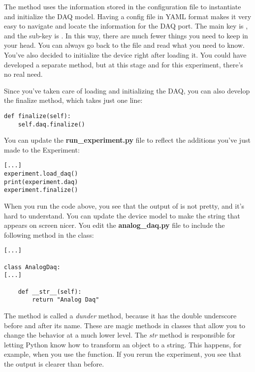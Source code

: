 The  method uses the information stored in the configuration file to instantiate and initialize the DAQ model. Having a config file in YAML format makes it very easy to navigate and locate the information for the DAQ port. The main key is , and the sub-key is . In this way, there are much fewer things you need to keep in your head. You can always go back to the file and read what you need to know. You've also decided to initialize the device right after loading it. You could have developed a separate method, but at this stage and for this experiment, there's no real need.

Since you've taken care of loading and initializing the DAQ, you can also develop the finalize method, which takes just one line:

\begin{verbatim}
def finalize(self):
    self.daq.finalize()
\end{verbatim}

You can update the \textbf{run\_experiment.py} file to reflect the additions you've just made to the Experiment:

\begin{verbatim}
[...]
experiment.load_daq()
print(experiment.daq)
experiment.finalize()
\end{verbatim}

When you run the code above, you see that the output of  is not pretty, and it's hard to understand. You can update the device model to make the string that appears on screen nicer. You edit the \textbf{analog\_daq.py} file to include the following method in the  class:

\begin{verbatim}
[...]

class AnalogDaq:
[...]

    def __str__(self):
        return "Analog Daq"
\end{verbatim}

The method  is called a \emph{dunder} method, because it has the double underscore before and after its name. These are magic methods in classes that allow you to change the behavior at a much lower level. The \emph{str} method is responsible for letting Python know how to transform an object to a string. This happens, for example, when you use the  function. If you rerun the experiment, you see that the output is clearer than before.

